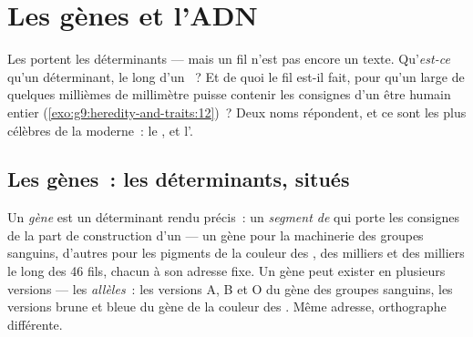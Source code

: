 \chapter{Les gènes et l'ADN}\label{ch:g9:genes-and-dna}

Les  portent les déterminants --- mais un fil
n'est pas encore un texte. Qu'\emph{est-ce} qu'un
déterminant, le long d'un ~? Et de quoi le fil
est-il fait, pour qu'un  large de quelques millièmes de
millimètre puisse contenir les consignes d'un être humain
entier (\cref{exo:g9:heredity-and-traits:12})~? Deux noms
répondent, et ce sont les plus célèbres de la 
moderne~: le , et l'.

\section{Les gènes~: les déterminants, situés}

\begin{definition}\label{def:g9:genes-and-dna:gene}
Un \emph{gène} est un déterminant rendu
précis~: un \emph{segment de } qui porte les
consignes de la part de construction d'un  --- un
gène pour la machinerie des groupes sanguins, d'autres pour
les pigments de la couleur des , des milliers et des
milliers le long des 46 fils, chacun à son adresse fixe. Un
gène peut exister en plusieurs versions --- les
\emph{allèles}~: les versions A, B et O du
gène des groupes sanguins, les versions brune et bleue du
gène de la couleur des . Même adresse, orthographe
différente.
\end{definition}

